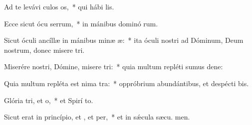 \item Ad te levávi culos os,~* qui hábi  lis.
\item Ecce sicut ócu serrum,~* in mánibus dominó rum.
\item Sicut óculi ancíllæ in mánibus minæ æ:~* ita óculi nostri ad Dóminum, Deum nostrum, donec misere tri.
\item Miserére nostri, Dómine, misere tri:~* quia multum repléti sumus dene:
\item Quia multum repléta est nima tra:~* oppróbrium abundántibus, et despécti bis.
\item Glória tri, et o,~* et Spirí to.
\item Sicut erat in princípio, et , et per,~* et in sǽcula sæcu. men.
